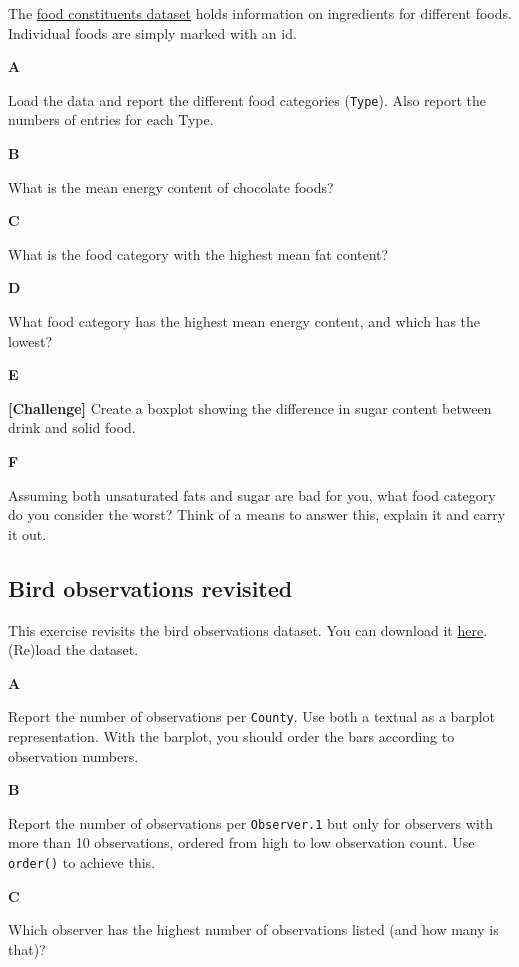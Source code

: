 \documentclass[]{book}
\begin{document}
The \href{https://raw.githubusercontent.com/MichielNoback/davur1_gitbook/master/data/food_constituents.txt}{food constituents dataset} holds information on ingredients for different foods. Individual foods are simply marked with an id.

\textbf{A}

Load the data and report the different food categories (\texttt{Type}). Also report the numbers of entries for each Type.

\textbf{B}

What is the mean energy content of chocolate foods?

\textbf{C}

What is the food category with the highest mean fat content?

\textbf{D}

What food category has the highest mean energy content, and which has the lowest?

\textbf{E}

\textbf{{[}Challenge{]}} Create a boxplot showing the difference in sugar content between drink and solid food.

\textbf{F}

Assuming both unsaturated fats and sugar are bad for you, what food category do you consider the worst? Think of a means to answer this, explain it and carry it out.

\hypertarget{bird-observations-revisited}{%
\subsection{Bird observations revisited}\label{bird-observations-revisited}}

This exercise revisits the bird observations dataset. You can download it \href{data/Observations-Data-2014.csv}{here}. (Re)load the dataset.

\textbf{A}

Report the number of observations per \texttt{County}. Use both a textual as a barplot representation. With the barplot, you should order the bars according to observation numbers.

\textbf{B}

Report the number of observations per \texttt{Observer.1} but only for observers with more than 10 observations, ordered from high to low observation count. Use \texttt{order()} to achieve this.

\textbf{C}

Which observer has the highest number of observations listed (and how many is that)?
\end{document}
